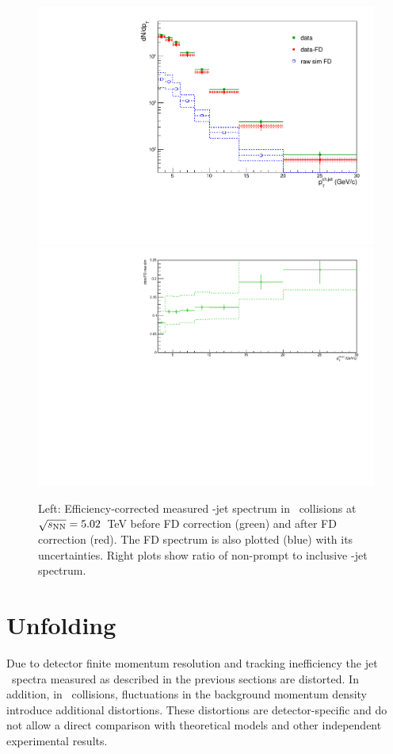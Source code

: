 \begin{figure}[bth]
\centering
\includegraphics[width=.53\textwidth]{pPbplots/jetSpectra/JetPtSpectra_FDsub}
\includegraphics[width=.45\textwidth]{pPbplots/jetSpectra/FDratio}
\caption{Left: Efficiency-corrected measured \Dstar-jet spectrum in \pPb\ collisions at $\sqrt{s_{\rm NN}}=5.02$~TeV before FD correction (green) and after FD correction (red). The FD spectrum is also plotted (blue) with its uncertainties. Right plots show ratio of non-prompt to inclusive \Dstar-jet spectrum.}
\label{fig:pPbFD_corr}
\end{figure}



\section{Unfolding}
\label{sect:unfResults}
Due to detector finite momentum resolution and tracking inefficiency the jet \pt\ spectra measured as described
in the previous sections are distorted. In addition, in \pPb\ collisions, fluctuations in the background momentum density
introduce additional distortions. These distortions are detector-specific and do not allow a direct comparison
with theoretical models and other independent experimental results.

